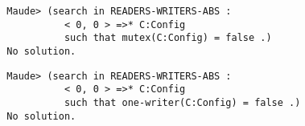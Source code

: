 \begin{small}
\begin{verbatim}
  Maude> (search in READERS-WRITERS-ABS :
            < 0, 0 > =>* C:Config 
            such that mutex(C:Config) = false .)
  No solution.
\end{verbatim}
\end{small}

\begin{small}
\begin{verbatim}
  Maude> (search in READERS-WRITERS-ABS :
            < 0, 0 > =>* C:Config 
            such that one-writer(C:Config) = false .)
  No solution.
\end{verbatim}
\end{small}
